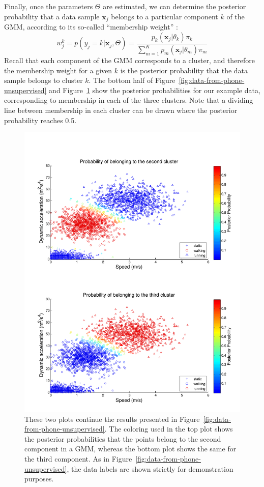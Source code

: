 Finally, once the parameters $\Theta$ are estimated, we can determine the posterior probability that a data sample $\mathbf{x}_j$ belongs to a particular component $k$ of the GMM, according to its so-called ``membership weight'' \cite{Smyth2015}:
%
\begin{equation}
  w_j^k = p(y_j = k|\mathbf{x}_j, \Theta) =  \frac{p_k(\mathbf{x}_j|\theta_k) \pi_k}{ \sum_{m=1}^K p_m(\mathbf{x}_j|\theta_m) \pi_m }
\end{equation}
%
Recall that each component of the GMM corresponds to a cluster, and therefore the membership weight for a given $k$ is the posterior probability that the data sample belongs to cluster $k$. The bottom half of Figure~\ref{fig:data-from-phone-unsupervised} and Figure~\ref{fig:data-from-phone-unsupervised2} show the posterior probabilities for our example data, corresponding to membership in each of the three clusters. Note that a dividing line between membership in each cluster can be drawn where the posterior probability reaches 0.5.
%
\begin{figure}
  \begin{center}
    \includegraphics[width=1.0\textwidth]{Images/figChapter3-3}
  \end{center}
  \caption[Further results from unsupervised learning]{These two plots continue the results presented in Figure~\ref{fig:data-from-phone-unsupervised}. The coloring used in the top plot shows the posterior probabilities that the points belong to the second component in a GMM, whereas the bottom plot shows the same for the third component. As in Figure~\ref{fig:data-from-phone-unsupervised}, the data labels are shown strictly for demonstration purposes.}
  \label{fig:data-from-phone-unsupervised2}
\end{figure}

